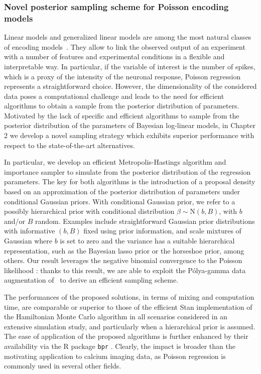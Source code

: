 \subsubsection{Novel posterior sampling scheme for Poisson encoding models}
Linear models and generalized linear models are among the most natural classes of encoding models~\parencite{paninski2007}. They allow to link the observed output of an experiment with a number of features and experimental conditions in a flexible and interpretable way. In particular, if the variable of interest is the number of spikes, which is a proxy of the intensity of the neuronal response, Poisson regression represents a straightforward choice. However, the dimensionality of the considered data poses a computational challenge and leads to the need for efficient algorithms to obtain a sample from the posterior distribution of parameters. 
Motivated by the lack of specific and efficient algorithms to sample from the posterior distribution of the parameters
of Bayesian log-linear models, in Chapter 2 we develop a novel sampling strategy which exhibits superior performance with respect to the state-of-the-art alternatives. 

In particular, we develop an efficient Metropolis-Hastings algorithm and importance sampler to simulate from the posterior distribution of the regression parameters.
The key for both algorithms is the introduction of a proposal density based on an approximation of the posterior distribution of parameters under conditional Gaussian priors. 
With conditional Gaussian prior, we refer to a possibly hierarchical prior with conditional distribution $\beta \sim \mathrm{N}(b, B)$, with $b$ and/or $B$ random. Examples include straightforward Gaussian prior distributions with informative $(b,B)$ fixed using prior information, and scale mixtures of Gaussian where $b$ is set to zero and the variance has a suitable hierarchical representation, such as the Bayesian lasso prior or the horseshoe prior, among others.
Our result leverages the negative binomial convergence to
the Poisson likelihood \parencite{casella2002}: thanks to this result, we are able to exploit the P\'olya-gamma data augmentation of~\textcite{polson_scott_2013} to derive an efficient sampling scheme. 

The performances of the proposed solutions, in terms of mixing and computation time, are comparable or superior to those of the efficient Stan implementation of the Hamiltonian Monte Carlo algorithm in all scenarios considered in an extensive simulation study, and particularly when a hierarchical prior is assumed. 
The ease of application of the proposed algorithms is further enhanced by their availability via the R package \texttt{bpr} \parencite{bpr}. Clearly, the impact is broader than the motivating application to calcium imaging data, as Poisson regression is commonly used in several other fields.


